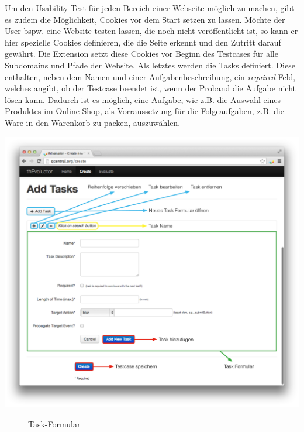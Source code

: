 Um den Usability-Test für jeden Bereich einer Webseite möglich zu machen, gibt es zudem die Möglichkeit, Cookies vor dem Start setzen zu lassen. Möchte der User bspw. eine Website testen lassen, die noch nicht veröffentlicht ist, so kann er hier spezielle Cookies definieren, die die Seite erkennt und den Zutritt darauf gewährt. Die Extension setzt diese Cookies vor Beginn des Testcases für alle Subdomains und Pfade der Website. Als letztes werden die Tasks definiert. Diese enthalten, neben dem Namen und einer Aufgabenbeschreibung, ein \textit{required} Feld, welches angibt, ob der Testcase beendet ist, wenn der Proband die Aufgabe nicht lösen kann. Dadurch ist es möglich, eine Aufgabe, wie z.B. die Auswahl eines Produktes im Online-Shop, als Vorraussetzung für die Folgeaufgaben, z.B. die Ware in den Warenkorb zu packen, auszuwählen.

\begin{center}
\includegraphics[scale=0.4]{./images/taskscreen}
\end{center}
\begin{figure}[htb]
   \centering
   \caption{Task-Formular}
    \label{taskscreen}
\end{figure}

